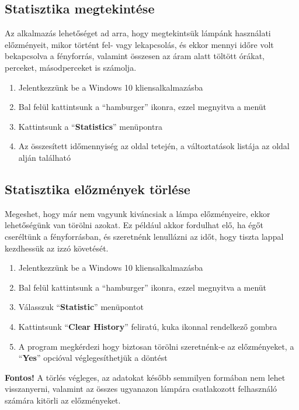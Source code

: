 \documentclass[a4paper,12pt]{report}
\begin{document}
    \subsection{Statisztika megtekintése}
    Az alkalmazás lehetőséget ad arra, hogy megtekintsük lámpánk használati előzményeit, mikor történt fel- vagy lekapcsolás,
    és ekkor mennyi időre volt bekapcsolva a fényforrás, valamint összesen az áram alatt töltött órákat, perceket, másodperceket is
    számolja.

    \begin{enumerate}
        \item Jelentkezzünk be a Windows 10 kliensalkalmazásba
        \item Bal felül kattintsunk a ``hamburger'' ikonra, ezzel megnyitva a menüt
        \item Kattintsunk a ``\textbf{Statistics}'' menüpontra
        \item Az összesített időmennyiség az oldal tetején, a változtatások listája az oldal alján található
    \end{enumerate}

    \subsection{Statisztika előzmények törlése}
    Megeshet, hogy már nem vagyunk kiváncsiak a lámpa előzményeire, ekkor lehetőségünk van törölni azokat. Ez például akkor
    fordulhat elő, ha égőt cseréltünk a fényforrásban, és szeretnénk lenullázni az időt, hogy tiszta lappal kezdhessük az izzó
    követését.

    \begin{enumerate}
        \item Jelentkezzünk be a Windows 10 kliensalkalmazásba
        \item Bal felül kattintsunk a ``hamburger'' ikonra, ezzel megnyitva a menüt
        \item Válasszuk ``\textbf{Statistic}'' menüpontot
        \item Kattintsunk ``\textbf{Clear History}'' feliratú, kuka ikonnal rendelkező gombra
        \item A program megkérdezi hogy biztosan törölni szeretnénk-e az előzményeket, a ``\textbf{Yes}'' opcióval véglegesíthetjük
        a döntést
    \end{enumerate}

    \textbf{Fontos!} A törlés végleges, az adatokat később semmilyen formában nem lehet visszanyerni, valamint az összes ugyanazon lámpára
    csatlakozott felhasználó számára kitörli az előzményeket.
\end{document}
